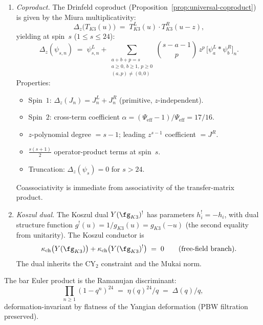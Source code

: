 \begin{theorem}
\begin{enumerate}[label=\textup{(\roman*)}]
\item \emph{Coproduct.}
The Drinfeld coproduct
(Proposition~\textup{\ref{prop:universal-coproduct}})
is given by the Miura multiplicativity:
\begin{equation}\label{eq:k3-yangian-coproduct}
  \Delta_z\bigl(T_{K3}(u)\bigr) \;=\;
  T_{K3}^L(u) \cdot T_{K3}^R(u - z),
\end{equation}
yielding at spin~$s$ ($1 \leq s \leq 24$):
\[
  \Delta_z(\psi_{s,n}) \;=\; \psi_{s,n}^L
  + \sum_{\substack{a + b + p = s \\ a \geq 0,\, b \geq 1,\, p \geq 0 \\
  (a,p) \neq (0,0)}}
  \binom{s - a - 1}{p}\, z^p \,
  \bigl[\psi_a^L \ast \psi_b^R\bigr]_n.
\]
Properties:
\begin{itemize}
  \item Spin~$1$: $\Delta_z(J_n) = J_n^L + J_n^R$ (primitive, $z$-independent).
  \item Spin~$2$: cross-term coefficient
    $\alpha = (\Psi_{\mathrm{eff}} - 1)/\Psi_{\mathrm{eff}} = 17/16$.
  \item $z$-polynomial degree $= s - 1$; leading $z^{s-1}$ coefficient $= J^R$.
  \item $\tfrac{s(s+1)}{2}$ operator-product terms at spin~$s$.
  \item Truncation: $\Delta_z(\psi_s) = 0$ for $s > 24$.
\end{itemize}
Coassociativity is immediate from associativity of the transfer-matrix
product.

\item \emph{Koszul dual.}
The Koszul dual $Y(\fg_{K3})^!$ has parameters $h_i^! = -h_i$, with
dual structure function $g^!(u) = 1/g_{K3}(u) = g_{K3}(-u)$
(the second equality from unitarity).
The Koszul conductor is
\[
  \kappa_{\mathrm{ch}}\bigl(Y(\fg_{K3})\bigr)
  + \kappa_{\mathrm{ch}}\bigl(Y(\fg_{K3})^!\bigr) \;=\; 0
  \qquad \text{(free-field branch)}.
\]
The dual inherits the CY$_2$ constraint and the Mukai norm.
\end{enumerate}

The bar Euler product is the Ramanujan discriminant:
\begin{equation}\label{eq:k3-yangian-bar-euler}
  \prod_{n \geq 1}(1 - q^n)^{24}
  \;=\; \eta(q)^{24}/q \;=\; \Delta(q)/q,
\end{equation}
deformation-invariant by flatness of the Yangian deformation
(PBW filtration preserved).
\end{theorem}

